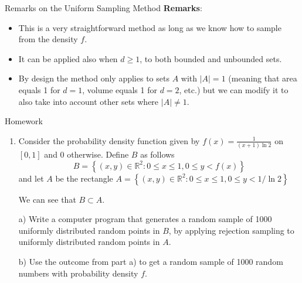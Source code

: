 \documentclass[8pt]{beamer}
\begin{document}
\begin{frame}{Remarks on the Uniform Sampling Method}
\textbf{Remarks}:

\begin{itemize}
	\item This is a very straightforward method as long as we know how to sample from the density $f$.
	\item It can be applied also when $d \geq 1$, to both bounded and unbounded sets.
	\item By design the method only applies to sets $A$ with $|A|=1$ (meaning that area equals 1 for $d=1$, volume equals 1 for $d=2$, etc.) but we can modify it to also take into account other sets where $|A| \neq 1$.
\end{itemize}
\end{frame}

\begin{frame}{Homework}
\begin{enumerate}
	\item Consider the probability density function given by $f(x)=\frac{1}{ (x+1)\ln 2}$ on $[0,1]$ and 0 otherwise. Define $B$ as follows
\begin{equation*}
B=\left\{(x,y) \in \mathbb{R}^2 : 0 \leq x \leq 1, 0 \leq y <f(x)\right\}
\end{equation*}
and let $A$ be the rectangle $A=\left\{(x,y) \in \mathbb{R}^2 : 0 \leq x \leq 1, 0 \leq y <1/\ln 2\right\}$

We can see that $B \subset A$.

a) Write a computer program that generates a random sample of 1000 uniformly distributed random points in $B$, by applying rejection sampling to uniformly distributed random points in $A$.

b) Use the outcome from part a) to get a random sample of 1000 random numbers with probability density $f$.
\end{enumerate}
\end{frame}
\end{document}

